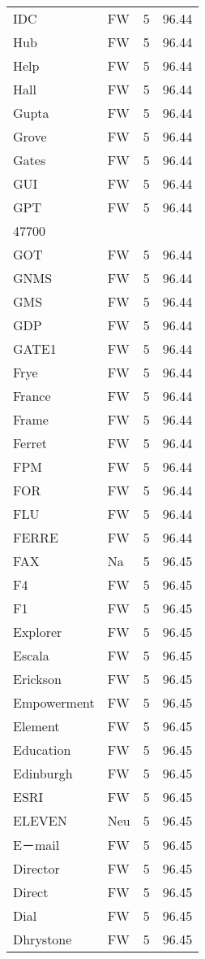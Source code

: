 \documentclass[twocolumn]{book}
\begin{document}
\begin{supertabular}{llrr}
IDC & FW & 5 &  96.44\\
Hub & FW & 5 &  96.44\\
Help & FW & 5 &  96.44\\
Hall & FW & 5 &  96.44\\
Gupta & FW & 5 &  96.44\\
Grove & FW & 5 &  96.44\\
Gates & FW & 5 &  96.44\\
GUI & FW & 5 &  96.44\\
GPT & FW & 5 &  96.44\\
47700\\
GOT & FW & 5 &  96.44\\
GNMS & FW & 5 &  96.44\\
GMS & FW & 5 &  96.44\\
GDP & FW & 5 &  96.44\\
GATE1 & FW & 5 &  96.44\\
Frye & FW & 5 &  96.44\\
France & FW & 5 &  96.44\\
Frame & FW & 5 &  96.44\\
Ferret & FW & 5 &  96.44\\
FPM & FW & 5 &  96.44\\
FOR & FW & 5 &  96.44\\
FLU & FW & 5 &  96.44\\
FERRE & FW & 5 &  96.44\\
FAX & Na & 5 &  96.45\\
F4 & FW & 5 &  96.45\\
F1 & FW & 5 &  96.45\\
Explorer & FW & 5 &  96.45\\
Escala & FW & 5 &  96.45\\
Erickson & FW & 5 &  96.45\\
Empowerment & FW & 5 &  96.45\\
Element & FW & 5 &  96.45\\
Education & FW & 5 &  96.45\\
Edinburgh & FW & 5 &  96.45\\
ESRI & FW & 5 &  96.45\\
ELEVEN & Neu & 5 &  96.45\\
E－mail & FW & 5 &  96.45\\
Director & FW & 5 &  96.45\\
Direct & FW & 5 &  96.45\\
Dial & FW & 5 &  96.45\\
Dhrystone & FW & 5 &  96.45\\

\end{supertabular}
\end{document}
